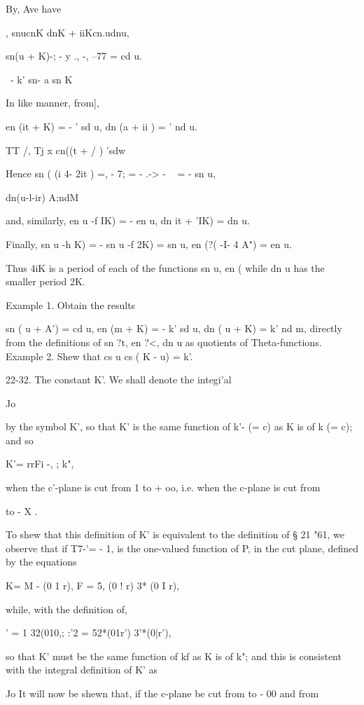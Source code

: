By, Ave have

, snucnK dnK + iiKcn.udnu,

sn(u + K)-; - y ., -, --77 = cd u.

  \ - k' sn- a sn K

In like manner, from],

en (it + K) = - ' sd u, dn (a + ii ) = ' nd u.

TT /, Tj x cn((t + / ) 'sdw

Hence sn ( (i 4- 2it ) =, - 7; = - .-> - ~ = - sn u,

  dn(u-l-ir) A;ndM

and, similarly, en u -f IK) = - en u, dn it + 'IK) = dn u.

Finally, sn u -h K) = - sn u -f 2K) = sn u, en (?( -I- 4 A") = en u.

Thus 4iK is a period of each of the functions sn u, en ( while dn u
has the smaller period 2K.

Example 1. Obtain the results

sn ( u + A') = cd u, en (m + K) = - k' sd u, dn ( u + K) = k' nd m,
directly from the definitions of sn ?t, en ?<, dn u as quotients of
Theta-functions. Example 2. Shew that cs u cs ( K - u) = k'.

%
%

22-32. The constant K'. We shall denote the integi'al

Jo

by the symbol K', so that K' is the same function of k'- (= c) as K is
of k (= c); and so

K'= rrFi -, ; k",

when the c'-plane is cut from 1 to + oo, i.e. when the c-plane is cut
from

to - X .

To shew that this definition of K' is equivalent to the definition of
§ 21 "61, we observe that if T7-'= - 1, is the one-valued function of
P, in the cut plane, defined by the equations

K= M - (0 1 r), F = 5, (0 ! r) 3* (0 I r),

while, with the definition of,

 ' = 1 32(010,; :'2 = 52*(01r') 3'*(0|r'),

so that K' must be the same function of kf as K is of k"; and this is
consistent with the integral definition of K' as

Jo It will now be shewn that, if the c-plane be cut from to - 00 and
from

